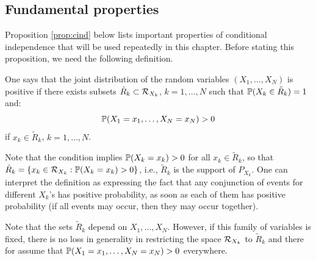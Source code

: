 \subsection{Fundamental properties}

Proposition \ref{prop:cind} below lists important properties of conditional
independence that will be used
repeatedly in this chapter. 
 Before stating this proposition, we need
the following definition.

\begin{definition} 
\label{def:posit}
One says that the joint distribution of the random variables $(X_1,
\ldots, X_N)$ is positive if there exists subsets $\tilde R_k\subset {\mathcal R}_{X_k}$, $k=1, \ldots, N$ such that $\bm{\mathbb P}(X_k\in \tilde R_k) = 1$ and:
\[
\bm{\mathbb P}(X_1=x_1, \ldots, X_N=x_N) > 0
\]
if $x_k\in \tilde R_k$, $k=1, \ldots, N$.
\end{definition}
Note that the condition implies $\bm{\mathbb P}(X_k = x_k) >0$ for all $x_k\in \tilde R_k$, so that $\tilde R_k = \{x_k\in {\mathcal R}_{X_k}: \bm{\mathbb P}(X_k=x_k) > 0\}$, i.e., $\tilde R_k$ is the support of $P_{X_k}$. One can interpret the definition as expressing the fact that any conjunction of events for different
$X_k$'s has positive probability, as soon as each of them has positive probability (if all events may occur, then they may occur together). 

Note that the sets $\tilde R_k$ depend on $X_1, \ldots, X_N$. However, if this family of variables is fixed, there is no loss in generality in restricting the space ${\mathcal R}_{X_k}$ to $\tilde R_k$ and there for assume that $\bm{\mathbb P}(X_1=x_1, \ldots, X_N=x_N) > 0$ everywhere.

